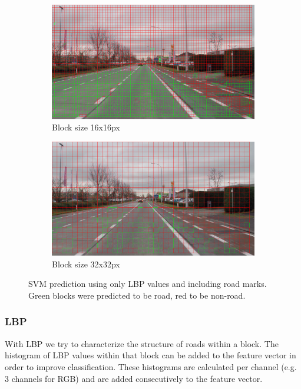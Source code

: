\documentclass[runningheads,a4paper]{llncs}
\begin{document}
\begin{figure}[h]
\centering
\begin{subfigure}{.49\textwidth}
  \centering
  \includegraphics[width=1\textwidth]{fig/svm_prediction_16_lbp_marks.png}
  \caption{Block size 16x16px}
\end{subfigure}
\begin{subfigure}{.49\textwidth}
  \centering
  \includegraphics[width=1\textwidth]{fig/svm_prediction_32_lbp_marks.png}
  \caption{Block size 32x32px}
\end{subfigure}
\caption{SVM prediction using only LBP values and including road marks. Green blocks were predicted to be road, red to be non-road.}
\label{fig:methods-block-sizes}
\end{figure}

\subsubsection{LBP}
With LBP we try to characterize the structure of roads within a block. The histogram of LBP values within that block can be added to the feature vector in order to improve classification. These histograms are calculated per channel (e.g. 3 channels for RGB) and are added consecutively to the feature vector. 
\end{document}
